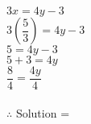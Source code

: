 {\begin{minipage}{\textwidth}
{\begin{enumerate}[label = \arabic*. ]
\begin{multicols}{2}
$ 3x =  4y -3 $ \redcheck \\
$ 3\left( \dfrac{5}{3}\right) =  4y -3 $ \redcheck \\
$ 5 =  4y -3 $ \redcheck \\
$ 5 +3=  4y  $ \redcheck \\
$ \dfrac{8}{4} = \dfrac{4y}{4}   $ \redcheck \\
\redcheck \\

$\therefore$ Solution =  \redcheck

\end{multicols} 
\end{enumerate}
}
\end{minipage}}
%